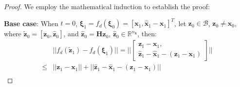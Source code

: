\documentclass[conference]{IEEEtran}
\newtheorem{proof}{\bf Proof}
\newcommand{\myvec}[1]{\boldsymbol{#1}}
\newcommand{\mymatrix}[1]{\boldsymbol{#1}}
\newcommand{\calB}{\mathcal{B}}
\newcommand{\bbR}{\mathbb{R}}
\begin{document}
\begin{proof}\label{proof:nncs Lipschitz continuity}
    We employ the mathematical induction to establish the proof: 
  
    \textbf{Base case}: When $t = 0$, $\myvec{\xi}_{1} = 
    f_{d}(\myvec{\xi}_{0}) = [\myvec{x}_{1}, 
    \hat{\myvec{x}}_{1} - \myvec{x}_{1}]^{T}$, 
    let $\myvec{z}_{0}\in \calB$, $\myvec{z}_{0} \neq \myvec{x}_{0}$, 
    where $\tilde{\myvec{z}}_{0} = [\myvec{z}_{0}, \hat{\myvec{z}}_{0}]$, 
    and $\hat{\myvec{z}}_{0} = \mymatrix{H}\myvec{z}_{0}$, 
    $\hat{\myvec{z}}_{0}\in \bbR^{n_{\myvec{x}}}$, then: 
    \begin{equation}~\label{eq:nncs Lipschitz continuity 1}
      \begin{aligned}
        &||f_{d}(\tilde{\myvec{z}}_{1}) - f_{d}(\myvec{\xi}_{1})|| = 
        ||\begin{bmatrix}
          \myvec{z}_{1} - \myvec{x}_{1},\\ 
          \hat{\myvec{z}}_{1} - \hat{\myvec{x}}_{1} - (\myvec{z}_{1} - \myvec{x}_{1})
        \end{bmatrix}|| \\ 
        \leq& || \myvec{z}_{1} - \myvec{x}_{1} || + || \hat{\myvec{z}}_{1} - \hat{\myvec{x}}_{1}  - (\myvec{z}_{1} - \myvec{x}_{1})||\\
      \end{aligned}

\end{equation}
\end{proof}
\end{document}
